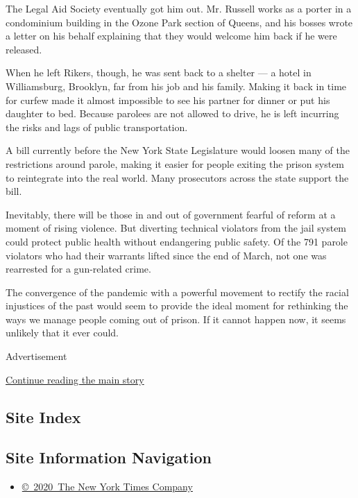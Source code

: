 The Legal Aid Society eventually got him out. Mr. Russell works as a
porter in a condominium building in the Ozone Park section of Queens,
and his bosses wrote a letter on his behalf explaining that they would
welcome him back if he were released.

When he left Rikers, though, he was sent back to a shelter --- a hotel
in Williamsburg, Brooklyn, far from his job and his family. Making it
back in time for curfew made it almost impossible to see his partner for
dinner or put his daughter to bed. Because parolees are not allowed to
drive, he is left incurring the risks and lags of public transportation.

A bill currently before the New York State Legislature would loosen many
of the restrictions around parole, making it easier for people exiting
the prison system to reintegrate into the real world. Many prosecutors
across the state support the bill.

Inevitably, there will be those in and out of government fearful of
reform at a moment of rising violence. But diverting technical violators
from the jail system could protect public health without endangering
public safety. Of the 791 parole violators who had their warrants lifted
since the end of March, not one was rearrested for a gun-related crime.

The convergence of the pandemic with a powerful movement to rectify the
racial injustices of the past would seem to provide the ideal moment for
rethinking the ways we manage people coming out of prison. If it cannot
happen now, it seems unlikely that it ever could.

Advertisement

\protect\hyperlink{after-bottom}{Continue reading the main story}

\hypertarget{site-index}{%
\subsection{Site Index}\label{site-index}}

\hypertarget{site-information-navigation}{%
\subsection{Site Information
Navigation}\label{site-information-navigation}}

\begin{itemize}
\tightlist
\item
  \href{https://help.nytimes3xbfgragh.onion/hc/en-us/articles/115014792127-Copyright-notice}{©~2020~The
  New York Times Company}
\end{itemize}

